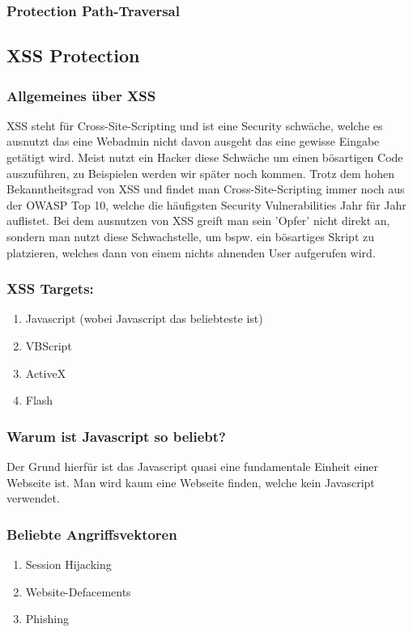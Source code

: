 \subsubsection{Protection Path-Traversal}
\subsection{XSS Protection}
\label{sec:xss}
\subsubsection{Allgemeines über XSS}
XSS steht für Cross-Site-Scripting und ist eine Security schwäche, welche es ausnutzt das eine Webadmin nicht davon ausgeht das eine gewisse Eingabe getätigt wird. Meist nutzt ein Hacker diese Schwäche um einen bösartigen Code auszuführen, zu Beispielen werden wir später noch kommen. Trotz dem hohen Bekanntheitsgrad von XSS und findet man Cross-Site-Scripting immer noch aus der OWASP Top 10, welche die häufigsten Security Vulnerabilities Jahr für Jahr auflistet. Bei dem ausnutzen von XSS greift man sein 'Opfer' nicht direkt an, sondern man nutzt diese Schwachstelle, um bspw. ein bösartiges Skript zu platzieren, welches dann von einem nichts ahnenden User aufgerufen wird. 
\subsubsection{XSS Targets:}
\begin{enumerate}
\item Javascript (wobei Javascript das beliebteste ist) 
\item VBScript 
\item ActiveX
\item Flash
\end{enumerate}
\subsubsection{Warum ist Javascript so beliebt?}
Der Grund hierfür ist das Javascript quasi eine fundamentale Einheit einer Webseite ist. Man wird kaum eine Webseite finden, welche kein Javascript verwendet.
\subsubsection{Beliebte Angriffsvektoren}
\begin{enumerate}
\item Session Hijacking
\item Website-Defacements 
\item Phishing
\end{enumerate}
